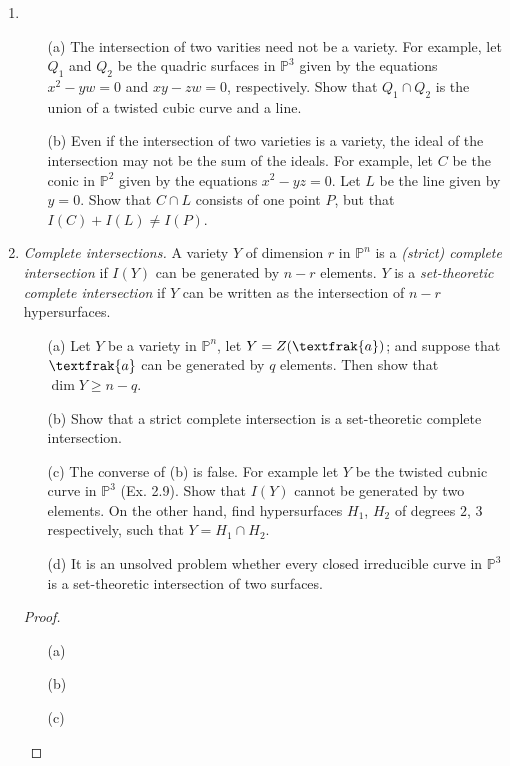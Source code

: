 \documentclass[12pt]{article}
\newcommand{\goth}[1]{\textfrak{#1}}
\newcommand{\PP}{\mathbb{P}}
\theoremstyle{definition}
\begin{document}
\begin{enumerate} [label=\textbf{\arabic*.}, leftmargin=-0.05em]
\item \begin{itemize}
    \item[(a)] The intersection of two varities need not be a variety. For example, let $Q_1$ and $Q_2$ be the quadric surfaces in $\PP^3$ given by the equations $x^2 - yw = 0$ and $xy - zw = 0$, respectively. Show that $Q_1 \cap Q_2$ is the union of a twisted cubic curve and a line.
    \item[(b)] Even if the intersection of two varieties is a variety, the ideal of the intersection may not be the sum of the ideals. For example, let $C$ be the conic in $\PP^2$ given by the equations $x^2 - yz = 0$. Let $L$ be the line given by $y = 0$. Show that $C \cap L$ consists of one point $P$, but that $I(C) + I(L) \neq I(P)$.
\end{itemize}

\item \textit{Complete intersections.} A variety $Y$ of dimension $r$ in $\PP^n$ is a \textit{(strict) complete intersection} if $I(Y)$ can be generated by $n - r$ elements. $Y$ is a \textit{set-theoretic complete intersection} if $Y$ can be written as the intersection of $n - r$ hypersurfaces.
\begin{itemize}
    \item[(a)] Let $Y$ be a variety in $\PP^n$, let $Y = Z(\goth{a})$; and suppose that $\goth{a}$ can be generated by $q$ elements. Then show that $\dim{Y} \geq n - q$.
    \item[(b)] Show that a strict complete intersection is a set-theoretic complete intersection.
    \item[(c)] The converse of (b) is false. For example let $Y$ be the twisted cubnic curve in $\PP^3$ (Ex. 2.9). Show that $I(Y)$ cannot be generated by two elements. On the other hand, find hypersurfaces $H_1$, $H_2$ of degrees $2$, $3$ respectively, such that $Y = H_1 \cap H_2$.
    \item[(d)] It is an unsolved problem whether every closed irreducible curve in $\PP^3$ is a set-theoretic intersection of two surfaces.
\end{itemize}

\begin{proof} $ $ \vspace{0pt}
   \begin{itemize}
    \item[(a)]
    \item[(b)]
    \item[(c)]
   \end{itemize} 
\end{proof}

\end{enumerate}
\end{document}
